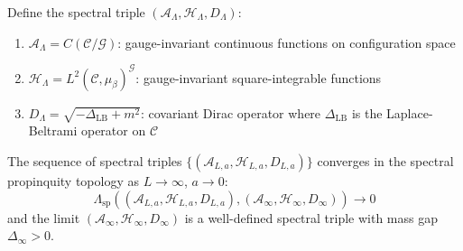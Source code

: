 \begin{definition}
Define the spectral triple $(\mathcal{A}_\Lambda, \mathcal{H}_\Lambda, D_\Lambda)$:
\begin{enumerate}[label=(\roman*)]
\item $\mathcal{A}_\Lambda = C(\mathcal{C}/\mathcal{G})$: gauge-invariant 
continuous functions on configuration space
\item $\mathcal{H}_\Lambda = L^2(\mathcal{C}, \mu_\beta)^{\mathcal{G}}$: 
gauge-invariant square-integrable functions
\item $D_\Lambda = \sqrt{-\Delta_{\text{LB}} + m^2}$: covariant Dirac operator 
where $\Delta_{\text{LB}}$ is the Laplace-Beltrami operator on $\mathcal{C}$
\end{enumerate}
\end{definition}

\begin{theorem}
\label{thm:spectral-continuum}
The sequence of spectral triples $\{(\mathcal{A}_{L,a}, \mathcal{H}_{L,a}, D_{L,a})\}$ 
converges in the spectral propinquity topology as $L \to \infty$, $a \to 0$:
\[
\Lambda_{\text{sp}}((\mathcal{A}_{L,a}, \mathcal{H}_{L,a}, D_{L,a}), 
(\mathcal{A}_\infty, \mathcal{H}_\infty, D_\infty)) \to 0
\]
and the limit $(\mathcal{A}_\infty, \mathcal{H}_\infty, D_\infty)$ is a 
well-defined spectral triple with mass gap $\Delta_\infty > 0$.
\end{theorem}

